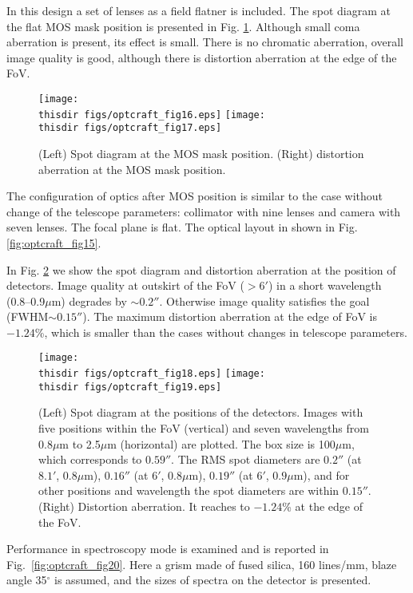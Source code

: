 In this design a set of lenses as a field flatner is included. 
The spot diagram at the flat MOS mask position is presented in 
Fig. \ref{fig:optcraft_fig16}.
Although small coma aberration is present, its effect is small. There is
no chromatic aberration, overall image quality is good, although there
is distortion aberration at the edge of the FoV.

\begin{figure}[!ht]
\centerline{
\texttt{[image: \\thisdir figs/optcraft\_fig16.eps]}
\texttt{[image: \\thisdir figs/optcraft\_fig17.eps]}
}
\caption{(Left) Spot diagram at the MOS mask position.
(Right) distortion aberration at the MOS mask position.
}
\label{fig:optcraft_fig16}
\end{figure}

The configuration of optics after MOS position is similar to the case
without change of the telescope parameters: collimator with nine lenses
and camera with seven lenses. The focal plane is flat. The optical
layout in shown in Fig.\ref{fig:optcraft_fig15}.

In Fig. \ref{fig:optcraft_fig18} we show the spot diagram and distortion
aberration at the position of detectors.
Image quality at outskirt of the FoV ($>6'$) in a short wavelength
(0.8--0.9$\mu$m) degrades by $\sim0.2''$. Otherwise image quality
satisfies the goal (FWHM$\sim 0.15''$).
The maximum distortion aberration at the edge of FoV is $-1.24$\%, which
is smaller than the cases without changes in telescope parameters.

\begin{figure}[!ht]
\centerline{
\texttt{[image: \\thisdir figs/optcraft\_fig18.eps]}
\texttt{[image: \\thisdir figs/optcraft\_fig19.eps]}
}
\caption{(Left) Spot diagram at the positions of the detectors.
Images with five positions within the FoV (vertical) and seven
 wavelengths from 0.8$\mu$m to 2.5$\mu$m (horizontal) are plotted.
The box size is 100$\mu$m, which corresponds to $0.59''$.
The RMS spot diameters are $0.2''$ (at $8.1'$, $0.8\mu$m), 
$0.16''$ (at $6'$, $0.8\mu$m), $0.19''$ (at $6'$, $0.9\mu$m), and for
 other positions and wavelength the spot diameters are within $0.15''$.
(Right) Distortion aberration. It reaches to $-1.24$\% at the edge of
 the FoV.
}
\label{fig:optcraft_fig18}
\end{figure}

Performance in spectroscopy mode is examined and is reported in 
Fig.~\ref{fig:optcraft_fig20}. Here a grism made of fused silica, 160
lines/mm, blaze angle 35$^\circ$ is assumed, and the sizes of spectra on
the detector is presented.

